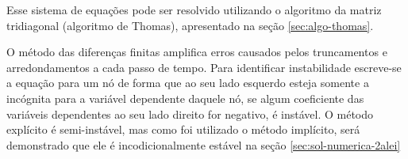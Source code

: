 Esse sistema de equações pode ser resolvido utilizando o algoritmo da matriz tridiagonal (algoritmo de Thomas), apresentado na seção \ref{sec:algo-thomas}.

O método das diferenças finitas amplifica erros causados pelos truncamentos e arredondamentos a cada passo de tempo. Para identificar instabilidade escreve-se a equação para um nó de forma que ao seu lado esquerdo esteja somente a incógnita para a variável dependente daquele nó, se algum coeficiente das variáveis dependentes ao seu lado direito for negativo, é instável. O método explícito é semi-instável, mas como foi utilizado o método implícito, será demonstrado que ele é incodicionalmente estável na seção \ref{sec:sol-numerica-2alei} 